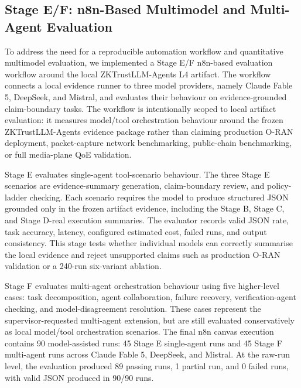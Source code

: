 \subsection{Stage E/F: n8n-Based Multimodel and Multi-Agent Evaluation}
\label{subsec:stage-ef-n8n-evaluation}

To address the need for a reproducible automation workflow and quantitative multimodel evaluation, we implemented a Stage E/F n8n-based evaluation workflow around the local ZKTrustLLM-Agents L4 artifact. The workflow connects a local evidence runner to three model providers, namely Claude Fable 5, DeepSeek, and Mistral, and evaluates their behaviour on evidence-grounded claim-boundary tasks. The workflow is intentionally scoped to local artifact evaluation: it measures model/tool orchestration behaviour around the frozen ZKTrustLLM-Agents evidence package rather than claiming production O-RAN deployment, packet-capture network benchmarking, public-chain benchmarking, or full media-plane QoE validation.

Stage E evaluates single-agent tool-scenario behaviour. The three Stage E scenarios are evidence-summary generation, claim-boundary review, and policy-ladder checking. Each scenario requires the model to produce structured JSON grounded only in the frozen artifact evidence, including the Stage B, Stage C, and Stage D-real execution summaries. The evaluator records valid JSON rate, task accuracy, latency, configured estimated cost, failed runs, and output consistency. This stage tests whether individual models can correctly summarise the local evidence and reject unsupported claims such as production O-RAN validation or a 240-run six-variant ablation.

Stage F evaluates multi-agent orchestration behaviour using five higher-level cases: task decomposition, agent collaboration, failure recovery, verification-agent checking, and model-disagreement resolution. These cases represent the supervisor-requested multi-agent extension, but are still evaluated conservatively as local model/tool orchestration scenarios. The final n8n canvas execution contains 90 model-assisted runs: 45 Stage E single-agent runs and 45 Stage F multi-agent runs across Claude Fable 5, DeepSeek, and Mistral. At the raw-run level, the evaluation produced 89 passing runs, 1 partial run, and 0 failed runs, with valid JSON produced in 90/90 runs.


